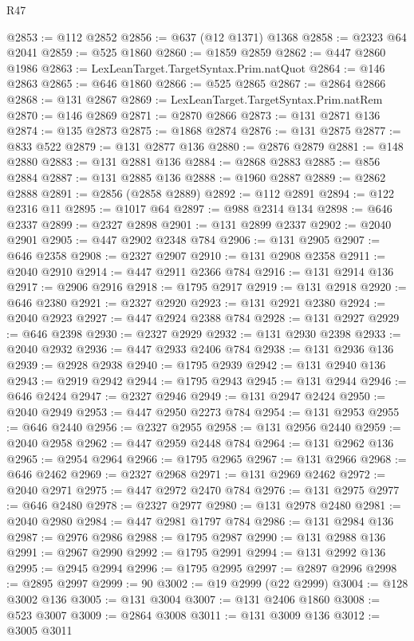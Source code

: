 \begin{lexlean}{R47}
\begin{coremodule}
@2853 := @112 @2852
@2856 := @637 (@12 @1371) @1368
@2858 := @2323 @64 @2041
@2859 := @525 @1860
@2860 := @1859 @2859
@2862 := @447 @2860 @1986
@2863 := LexLeanTarget.TargetSyntax.Prim.natQuot
@2864 := @146 @2863
@2865 := @646 @1860
@2866 := @525 @2865
@2867 := @2864 @2866
@2868 := @131 @2867
@2869 := LexLeanTarget.TargetSyntax.Prim.natRem
@2870 := @146 @2869
@2871 := @2870 @2866
@2873 := @131 @2871 @136
@2874 := @135 @2873
@2875 := @1868 @2874
@2876 := @131 @2875
@2877 := @833 @522
@2879 := @131 @2877 @136
@2880 := @2876 @2879
@2881 := @148 @2880
@2883 := @131 @2881 @136
@2884 := @2868 @2883
@2885 := @856 @2884
@2887 := @131 @2885 @136
@2888 := @1960 @2887
@2889 := @2862 @2888
@2891 := @2856 (@2858 @2889)
@2892 := @112 @2891
@2894 := @122 @2316 @11
@2895 := @1017 @64
@2897 := @988 @2314 @134
@2898 := @646 @2337
@2899 := @2327 @2898
@2901 := @131 @2899 @2337
@2902 := @2040 @2901
@2905 := @447 @2902 @2348 @784
@2906 := @131 @2905
@2907 := @646 @2358
@2908 := @2327 @2907
@2910 := @131 @2908 @2358
@2911 := @2040 @2910
@2914 := @447 @2911 @2366 @784
@2916 := @131 @2914 @136
@2917 := @2906 @2916
@2918 := @1795 @2917
@2919 := @131 @2918
@2920 := @646 @2380
@2921 := @2327 @2920
@2923 := @131 @2921 @2380
@2924 := @2040 @2923
@2927 := @447 @2924 @2388 @784
@2928 := @131 @2927
@2929 := @646 @2398
@2930 := @2327 @2929
@2932 := @131 @2930 @2398
@2933 := @2040 @2932
@2936 := @447 @2933 @2406 @784
@2938 := @131 @2936 @136
@2939 := @2928 @2938
@2940 := @1795 @2939
@2942 := @131 @2940 @136
@2943 := @2919 @2942
@2944 := @1795 @2943
@2945 := @131 @2944
@2946 := @646 @2424
@2947 := @2327 @2946
@2949 := @131 @2947 @2424
@2950 := @2040 @2949
@2953 := @447 @2950 @2273 @784
@2954 := @131 @2953
@2955 := @646 @2440
@2956 := @2327 @2955
@2958 := @131 @2956 @2440
@2959 := @2040 @2958
@2962 := @447 @2959 @2448 @784
@2964 := @131 @2962 @136
@2965 := @2954 @2964
@2966 := @1795 @2965
@2967 := @131 @2966
@2968 := @646 @2462
@2969 := @2327 @2968
@2971 := @131 @2969 @2462
@2972 := @2040 @2971
@2975 := @447 @2972 @2470 @784
@2976 := @131 @2975
@2977 := @646 @2480
@2978 := @2327 @2977
@2980 := @131 @2978 @2480
@2981 := @2040 @2980
@2984 := @447 @2981 @1797 @784
@2986 := @131 @2984 @136
@2987 := @2976 @2986
@2988 := @1795 @2987
@2990 := @131 @2988 @136
@2991 := @2967 @2990
@2992 := @1795 @2991
@2994 := @131 @2992 @136
@2995 := @2945 @2994
@2996 := @1795 @2995
@2997 := @2897 @2996
@2998 := @2895 @2997
@2999 := 90
@3002 := @19 @2999 (@22 @2999)
@3004 := @128 @3002 @136
@3005 := @131 @3004
@3007 := @131 @2406 @1860
@3008 := @523 @3007
@3009 := @2864 @3008
@3011 := @131 @3009 @136
@3012 := @3005 @3011

\end{coremodule}
\end{lexlean}
